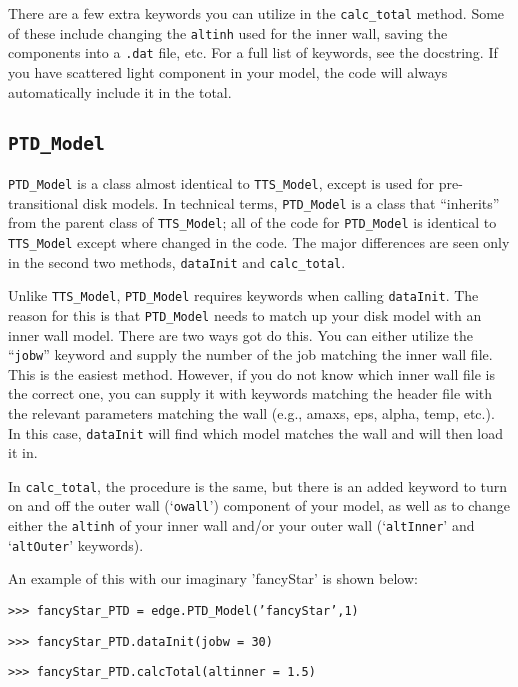 \documentclass{emulateapj}
\begin{document}
There are a few extra keywords you can utilize in the \texttt{calc\_total} method. Some of these include changing the \texttt{altinh} used for the inner wall, saving the components into a \texttt{.dat} file, etc. For a full list of keywords, see the docstring. If you have scattered light component in your model, the code will always automatically include it in the total. 
 
\subsection{\texttt{PTD\_Model}}
 
\texttt{PTD\_Model} is a class almost identical to \texttt{TTS\_Model}, except is used for pre-transitional disk models. In technical terms, \texttt{PTD\_Model} is a class that “inherits” from the parent class of \texttt{TTS\_Model}; all of the code for \texttt{PTD\_Model} is identical to \texttt{TTS\_Model} except where changed in the code. The major differences are seen only in the second two methods, \texttt{dataInit} and \texttt{calc\_total}.
 
Unlike \texttt{TTS\_Model}, \texttt{PTD\_Model} requires keywords when calling \texttt{dataInit}. The reason for this is that \texttt{PTD\_Model} needs to match up your disk model with an inner wall model. There are two ways got do this. You can either utilize the “\texttt{jobw}” keyword and supply the number of the job matching the inner wall file. This is the easiest method. However, if you do not know which inner wall file is the correct one, you can supply it with keywords matching the header file with the relevant parameters matching the wall (e.g., amaxs, eps, alpha, temp, etc.). In this case, \texttt{dataInit} will find which model matches the wall and will then load it in. 

 
In \texttt{calc\_total}, the procedure is the same, but there is an added keyword to turn on and off the outer wall (‘\texttt{owall}’) component of your model, as well as to change either the \texttt{altinh} of your inner wall and/or your outer wall (‘\texttt{altInner}’ and ‘\texttt{altOuter}’ keywords). 
 
 An example of this with our imaginary 'fancyStar' is shown below:

\vspace{2mm}
\texttt{>>> fancyStar\_PTD = edge.PTD\_Model('fancyStar',1)}

\texttt{>>> fancyStar\_PTD.dataInit(jobw = 30)}

\texttt{>>> fancyStar\_PTD.calcTotal(altinner = 1.5)}
\vspace{2mm}
 
\end{document}
